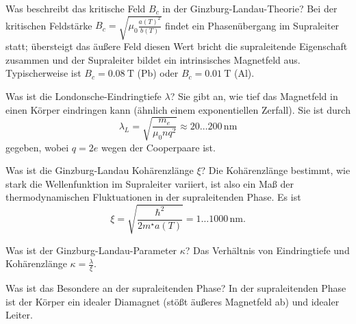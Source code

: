 \begin{fquestion}{Was beschreibt das kritische Feld $B_c$ in der Ginzburg-Landau-Theorie?}
    Bei der kritischen Feldstärke $B_c = \sqrt{\mu_0 \frac{a(T)^2}{b(T)}}$ findet ein Phasenübergang im Supraleiter statt; übersteigt das äußere Feld diesen Wert bricht die supraleitende Eigenschaft zusammen und der Supraleiter bildet ein intrinsisches Magnetfeld aus. 
    Typischerweise ist $B_c = \SI{0.08}{\tesla}$ (Pb) oder $B_c = \SI{0.01}{\tesla}$ (Al).
\end{fquestion}

\begin{fquestion}{Was ist die Londonsche-Eindringtiefe $\lambda$?}
    Sie gibt an, wie tief das Magnetfeld in einen Körper eindringen kann (ähnlich einem exponentiellen Zerfall).
    Sie ist durch  
    \[\lambda_L = \sqrt{\frac{m_e}{\mu_0 n q^2}} \approx 20 \ldots 200\, \si{\nano \metre}\]
    gegeben, wobei $q = 2 e$ wegen der Cooperpaare ist.
\end{fquestion}

\begin{fquestion}{Was ist die Ginzburg-Landau Kohärenzlänge $\xi$?}
    Die Kohärenzlänge bestimmt, wie stark die Wellenfunktion im Supraleiter variiert, ist also ein Maß der thermodynamischen Fluktuationen in der supraleitenden Phase.
    Es ist 
    \[\xi = \sqrt{\frac{\hbar^2}{2 m^\star a(T)}} = 1 \ldots 1000\, \si{\nano\metre}.\]
\end{fquestion}

\begin{fquestion} {Was ist der Ginzburg-Landau-Parameter $\kappa$?}
    Das Verhältnis von Eindringtiefe und Kohärenzlänge \(\kappa = \frac{\lambda}{\xi}\).
\end{fquestion}


\begin{fquestion}{Was ist das Besondere an der supraleitenden Phase? }
    In der supraleitenden Phase ist der Körper ein idealer Diamagnet (stößt äußeres Magnetfeld ab) und idealer Leiter.
\end{fquestion}

